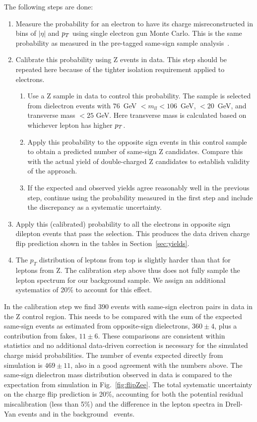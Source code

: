The following steps are done:
\begin{enumerate}
	\item Measure the probability for an electron to have its charge misreconstructed 
		in bins of $|\eta |$ and $p_T$ using single electron gun Monte Carlo.
		This is the same probability as measured in the pre-tagged same-sign sample analysis~\cite{ssnote2011}.
	\item Calibrate this probability using Z events in data. 
		This step should be repeated here because of the tighter isolation requirement applied to electrons.
	\begin{enumerate}
		\item Use a Z sample in data to control this probability.
			The sample is selected from dielectron events with $76$\ GeV $ < m_{ll} < 106$\ GeV,  
			\met $ < 20$\ GeV, and transverse mass $< 25$ GeV.
			Here transverse mass is calculated based on whichever lepton has higher $p_T$. 
		\item Apply this probability to the opposite sign events in this control sample
			to obtain a predicted number of same-sign Z candidates.
			Compare this with the actual yield of double-charged Z candidates
			to establish validity of the approach.
		\item If the expected and observed yields agree reasonably well in the previous step, continue using
			the probability measured in the first step and include the discrepancy as a systematic uncertainty.
	\end{enumerate}
	\item Apply this (calibrated) probability to all the electrons in opposite sign dilepton events that pass the selection. 
		This produces the data driven charge flip  prediction shown in the tables in Section~\ref{sec:yields}. 
	\item The $p_T$ distribution of leptons from top is slightly harder than that for leptons from Z. 
		The calibration step above thus does not fully sample the lepton spectrum for our background sample. 
		We assign an additional systematics of 20\% to account for this effect.
\end{enumerate}

In the calibration step we find 390 events with same-sign electron pairs in data in the Z control region.
This needs to be compared with the sum of the expected same-sign events as estimated from
opposite-sign dielectrons, $360\pm4$, plus a contribution from fakes, $11\pm 6$.
These comparisons are consistent within statistics and no additional data-driven correction
is necessary for the simulated charge misid probabilities.
The number of events expected directly from simulation is  $469\pm 11$, also in a good agreement with the numbers above.
The same-sign dielectron mass distribution observed in data is compared to the expectation from
simulation in Fig.~\ref{fig:flipZee}.
The total systematic uncertainty on the charge flip prediction is 20\%,
accounting for both the potential residual miscalibration (less than 5\%) and the difference in the lepton
spectra in Drell-Yan events and in the background \ttbar\ events.


